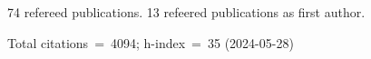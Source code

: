 74 refereed publications. 13 refeered publications as first author.

Total citations~=~4094; h-index~=~35 (2024-05-28)